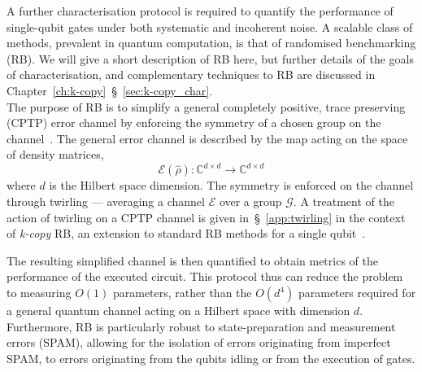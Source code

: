     A further characterisation protocol is required to quantify the performance
    of single-qubit gates under both systematic and incoherent noise.
    A scalable class of methods, prevalent in quantum
    computation, is that of randomised benchmarking (RB). We will give a short
    description of RB here, but further details of the goals of
    characterisation, and complementary techniques to RB are discussed in
    Chapter~\ref{ch:k-copy}~\S~\ref{sec:k-copy_char}.\\

    The purpose of RB is to simplify a general completely positive, trace preserving (CPTP) error channel by enforcing the
    symmetry of a chosen group on the channel~\cite{hashim_practical_2025}.
    The general error channel is described by the map acting on the space of density matrices,
    \begin{equation}
    \mathcal{E}(\hat\rho): \mathbb{C}^{d\times d}\rightarrow\mathbb{C}^{d\times d}
    \end{equation}
    where $d$ is the Hilbert space dimension.
    The symmetry is enforced on the channel through twirling --- averaging a channel $\mathcal{E}$
    over a group $\mathcal{G}$.
    A treatment of the action of twirling on a CPTP channel is given
    in~\S~\ref{app:twirling} in the context of \emph{k-copy}
    RB, an extension to standard RB methods for a single qubit~\cite{knill_randomized_2008}.

    The resulting simplified channel is
    then quantified to obtain metrics of the performance of the executed circuit.
    This protocol thus can reduce the problem to measuring $O(1)$
    parameters, rather than the $O(d^4)$ parameters required for a general
    quantum channel acting on a Hilbert space with dimension $d$. Furthermore, RB is
    particularly robust to state-preparation and measurement errors (SPAM),
    allowing for the isolation of errors originating from imperfect SPAM, to
    errors originating from the qubits idling or from the execution of gates.\\


